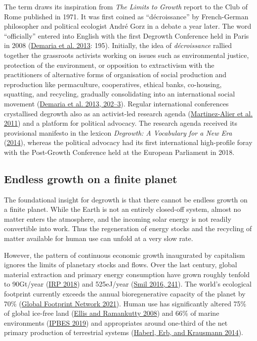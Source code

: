 \documentclass[a4paper, nobind]{templates/ociamthesis}
\begin{document}
The term draws its inspiration from \emph{The Limits to Growth} report to the Club of Rome published in 1971. It was first coined as ``décroissance'' by French-German philosopher and political ecologist André Gorz in a debate a year later. The word ``officially'' entered into English with the first Degrowth Conference held in Paris in 2008 (\protect\hyperlink{ref-demaria_what_2013}{Demaria et al. 2013}: 195). Initially, the idea of \emph{décroissance} rallied together the grassroots activists working on issues such as environmental justice, protection of the environment, or opposition to extractivism with the practitioners of alternative forms of organisation of social production and reproduction like permaculture, cooperatives, ethical banks, co-housing, squatting, and recycling, gradually consolidating into an international social movement (\protect\hyperlink{ref-demaria_what_2013}{Demaria et al. 2013, 202--3}). Regular international conferences crystallised degrowth also as an activist-led research agenda (\protect\hyperlink{ref-martinez-alier_science_2011}{Martinez-Alier et al. 2011}) and a platform for political advocacy. The research agenda received its provisional manifesto in the lexicon \emph{Degrowth: A Vocabulary for a New Era} (\protect\hyperlink{ref-dalisa_degrowth_2014}{2014}), whereas the political advocacy had its first international high-profile foray with the Post-Growth Conference held at the European Parliament in 2018.

\hypertarget{endless-growth-on-a-finite-planet}{%
\subsection{Endless growth on a finite planet}\label{endless-growth-on-a-finite-planet}}

The foundational insight for degrowth is that there cannot be endless growth on a finite planet. While the Earth is not an entirely closed-off system, almost no matter enters the atmosphere, and the incoming solar energy is not readily convertible into work. Thus the regeneration of energy stocks and the recycling of matter available for human use can unfold at a very slow rate.

However, the pattern of continuous economic growth inaugurated by capitalism ignores the limits of planetary stocks and flows. Over the last century, global material extraction and primary energy consumption have grown roughly tenfold to 90Gt/year (\protect\hyperlink{ref-irp_global_2018}{IRP 2018}) and 525eJ/year (\protect\hyperlink{ref-smil_energy_2016}{Smil 2016, 241}). The world's ecological footprint currently exceeds the annual bioregenerative capacity of the planet by 70\% (\protect\hyperlink{ref-global_footprint_network_earth_2021}{Global Footprint Network 2021}). Human use has significantly altered 75\% of global ice-free land (\protect\hyperlink{ref-ellis_putting_2008}{Ellis and Ramankutty 2008}) and 66\% of marine environments (\protect\hyperlink{ref-ipbes_global_2019}{IPBES 2019}) and appropriates around one-third of the net primary production of terrestrial systems (\protect\hyperlink{ref-haberl_human_2014}{Haberl, Erb, and Krausmann 2014}).
\end{document}
